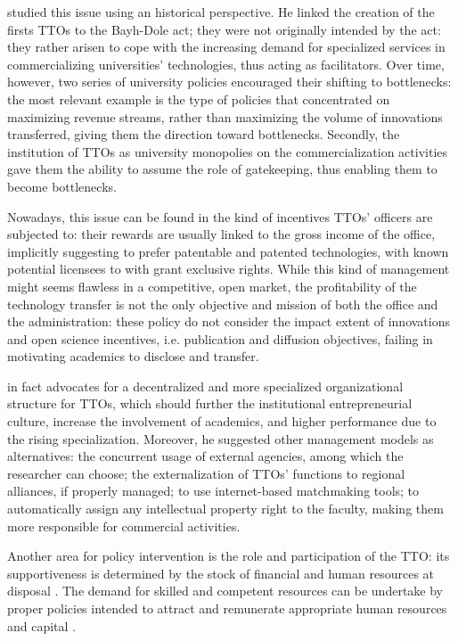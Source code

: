\citet{Litan2008} studied this issue using an historical perspective. He linked the creation of the firsts TTOs to the Bayh-Dole act; they were not originally intended by the act: they rather arisen to cope with the increasing demand for specialized services in commercializing universities' technologies, thus acting as facilitators. Over time, however, two series of university policies encouraged their shifting to bottlenecks: the most relevant example is the type of policies that concentrated on maximizing revenue streams, rather than maximizing the volume of innovations transferred, giving them the direction toward bottlenecks. Secondly, the institution of TTOs as university monopolies on the commercialization activities gave them the ability to assume the role of gatekeeping, thus enabling them to become bottlenecks.

Nowadays, this issue can be found in the kind of incentives TTOs' officers are subjected to: their rewards are usually linked to the gross income of the office, implicitly suggesting to prefer patentable and patented technologies, with known potential licensees to with grant exclusive rights. While this kind of management might seems flawless in a competitive, open market, the profitability of the technology transfer is not the only objective and mission of both the office and the administration: these policy do not consider the impact extent of innovations and open science incentives, i.e. publication and diffusion objectives, failing in motivating academics to disclose and transfer. 

\citet{Litan2008} in fact advocates for a decentralized and more specialized organizational structure for TTOs, which should further the institutional entrepreneurial culture, increase the involvement of academics, and higher performance due to the rising specialization. Moreover, he suggested other management models as alternatives: the concurrent usage of external agencies, among which the researcher can choose; the externalization of TTOs' functions to regional alliances, if properly managed; to use internet-based matchmaking tools; to automatically assign any intellectual property right to the faculty, making them more responsible for commercial activities. 

Another area for policy intervention is the role and participation of the TTO: its supportiveness is determined by the stock of financial and human resources at disposal \citep{Siegel2007}. The demand for skilled and competent resources can be undertake by proper policies intended to attract and remunerate appropriate human resources and capital \citep{Rasmussen2006}.

